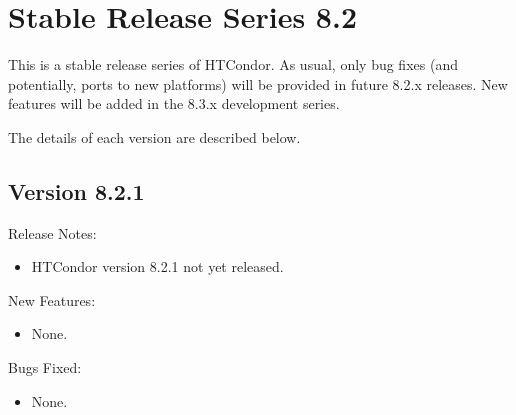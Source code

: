 
\section{\label{sec:History-8-2}Stable Release Series 8.2}

This is a stable release series of HTCondor.
As usual, only bug fixes (and potentially, ports to new platforms)
will be provided in future 8.2.x releases.
New features will be added in the 8.3.x development series.

The details of each version are described below.

\subsection*{\label{sec:New-8-2-1}Version 8.2.1}

\noindent Release Notes:

\begin{itemize}

\item HTCondor version 8.2.1 not yet released.

\end{itemize}


\noindent New Features:

\begin{itemize}

\item None.

\end{itemize}

\noindent Bugs Fixed:

\begin{itemize}

\item None.

\end{itemize}

